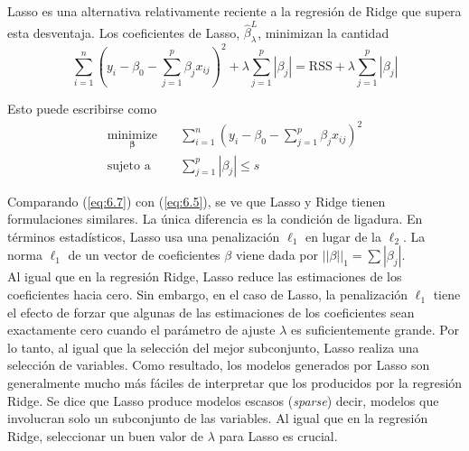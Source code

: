 Lasso es una alternativa relativamente reciente a la regresión de Ridge que supera esta desventaja. Los coeficientes de Lasso, $\hat{\beta}^{L}_{\lambda}$, minimizan la cantidad
\begin{equation}
\sum_{i = 1}^n \left(y_i - \beta_0 - \sum_{j=1}^p \beta_j x_{ij}\right)^2 + \lambda \sum_{j=1}^p |\beta_j| = \text{RSS} + \lambda \sum_{j=1}^p |\beta_j| 
\label{eq:6.7}
\end{equation}

\noindent Esto puede escribirse como 
\begin{align}
\underset{\boldsymbol{\beta}}{\text{minimize}} \quad &\sum_{i=1}^{n}\left(y_i - \beta_0 - \sum_{j=1}^{p}\beta_j x_{ij}\right)^2 \\
\text{sujeto a} \quad &\sum_{j=1}^{p}|\beta_j| \leq s \label{eq:6.9}
\end{align}

Comparando (\ref{eq:6.7}) con (\ref{eq:6.5}), se ve que Lasso y Ridge tienen formulaciones similares. La única diferencia es la condición de ligadura. En términos estadísticos, Lasso usa una penalización $\ell_1$ en lugar de la $\ell_2$. La norma $\ell_1$ de un vector de coeficientes $\beta$ viene dada por $||\beta||_1 = \sum |\beta_j|$. \\

Al igual que en la regresión Ridge, Lasso reduce las estimaciones de los coeficientes hacia cero. Sin embargo, en el caso de Lasso, la penalización $\ell_1$ tiene el efecto de forzar que algunas de las estimaciones de los coeficientes sean exactamente cero cuando el parámetro de ajuste $\lambda$ es suficientemente grande. Por lo tanto, al igual que la selección del mejor subconjunto, Lasso realiza una selección de variables. Como resultado, los modelos generados por Lasso son generalmente mucho más fáciles de interpretar que los producidos por la regresión Ridge. Se dice que Lasso produce modelos escasos (\textit{sparse}) decir, modelos que involucran solo un subconjunto de las variables. Al igual que en la regresión Ridge, seleccionar un buen valor de $\lambda$ para Lasso es crucial.

